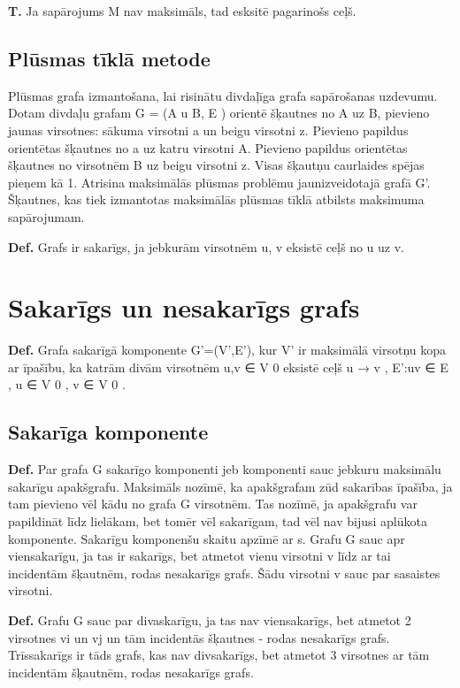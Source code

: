 \documentclass{article}
\begin{document}
\textbf{T. } Ja sapārojums M nav maksimāls, tad esksitē pagarinošs ceļš.

\subsection{Plūsmas tīklā metode}

Plūsmas grafa izmantošana, lai risinātu divdaļīga grafa sapārošanas uzdevumu. Dotam divdaļu grafam G = (A u B, E ) orientē šķautnes no A uz B, pievieno jaunas virsotnes: sākuma virsotni a un beigu virsotni z. Pievieno papildus orientētas šķautnes no a uz katru virsotni A. Pievieno papildus orientētas šķautnes no virsotnēm B uz beigu virsotni z. Visas šķautņu caurlaides spējas pieņem kā 1. Atrisina maksimālās plūsmas problēmu jaunizveidotajā grafā G'.  Šķautnes, kas tiek izmantotas maksimālās plūsmas tīklā atbilsts maksimuma sapārojumam.

\textbf{Def.}  Grafs ir sakarīgs, ja jebkurām virsotnēm u, v eksistē ceļš no u uz v.

\section{Sakarīgs un nesakarīgs grafs}

\textbf{Def.}  Grafa sakarīgā komponente G'=(V',E'), kur V' ir maksimālā virsotņu kopa ar īpašību,
ka katrām divām virsotnēm u,v ∈ V 0 eksistē ceļš u → v , E':uv ∈ E , u ∈ V 0 , v ∈ V 0 .

\subsection{Sakarīga komponente}

\textbf{Def.}  Par grafa G sakarīgo komponenti jeb komponenti sauc jebkuru maksimālu sakarīgu apakšgrafu.  Maksimāls nozīmē, ka apakšgrafam zūd sakarības īpašība, ja tam pievieno vēl kādu no grafa G virsotnēm. Tas nozīmē, ja apakšgrafu var papildināt līdz lielākam, bet tomēr vēl sakarīgam, tad vēl nav bijusi aplūkota komponente.  Sakarīgu komponenšu skaitu apzīmē ar s.  Grafu G sauc apr viensakarīgu, ja tas ir sakarīgs, bet atmetot vienu virsotni v līdz ar tai incidentām šķautnēm, rodas nesakarīgs grafs. Šādu virsotni v sauc par sasaistes virsotni.

\textbf{Def.} Grafu G sauc par divaskarīgu, ja tas nav viensakarīgs, bet atmetot 2 virsotnes vi un vj un tām incidentās šķautnes - rodas nesakarīgs grafs. Trīssakarīgs ir tāds grafs, kas nav divsakarīgs, bet atmetot 3 virsotnes ar tām incidentām šķautnēm, rodas nesakarīgs grafs.
\end{document}
